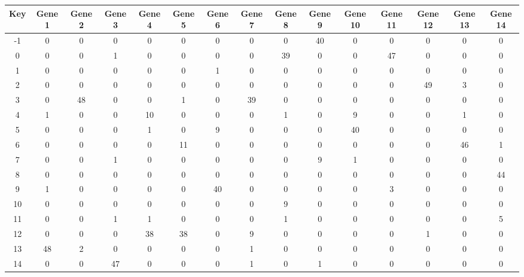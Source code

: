 \begin{tabular}{|c|c|c|c|c|c|c|c|c|c|c|c|c|c|c|}
\hline
Key & Gene 1 & Gene 2 & Gene 3 & Gene 4 & Gene 5 & Gene 6 & Gene 7 & Gene 8 & Gene 9 & Gene 10 & Gene 11 & Gene 12 & Gene 13 & Gene 14 \\
\hline
-1 & 0 & 0 & 0 & 0 & 0 & 0 & 0 & 0 & 40 & 0 & 0 & 0 & 0 & 0 \\
0 & 0 & 0 & 1 & 0 & 0 & 0 & 0 & 39 & 0 & 0 & 47 & 0 & 0 & 0 \\
1 & 0 & 0 & 0 & 0 & 0 & 1 & 0 & 0 & 0 & 0 & 0 & 0 & 0 & 0 \\
2 & 0 & 0 & 0 & 0 & 0 & 0 & 0 & 0 & 0 & 0 & 0 & 49 & 3 & 0 \\
3 & 0 & 48 & 0 & 0 & 1 & 0 & 39 & 0 & 0 & 0 & 0 & 0 & 0 & 0 \\
4 & 1 & 0 & 0 & 10 & 0 & 0 & 0 & 1 & 0 & 9 & 0 & 0 & 1 & 0 \\
5 & 0 & 0 & 0 & 1 & 0 & 9 & 0 & 0 & 0 & 40 & 0 & 0 & 0 & 0 \\
6 & 0 & 0 & 0 & 0 & 11 & 0 & 0 & 0 & 0 & 0 & 0 & 0 & 46 & 1 \\
7 & 0 & 0 & 1 & 0 & 0 & 0 & 0 & 0 & 9 & 1 & 0 & 0 & 0 & 0 \\
8 & 0 & 0 & 0 & 0 & 0 & 0 & 0 & 0 & 0 & 0 & 0 & 0 & 0 & 44 \\
9 & 1 & 0 & 0 & 0 & 0 & 40 & 0 & 0 & 0 & 0 & 3 & 0 & 0 & 0 \\
10 & 0 & 0 & 0 & 0 & 0 & 0 & 0 & 9 & 0 & 0 & 0 & 0 & 0 & 0 \\
11 & 0 & 0 & 1 & 1 & 0 & 0 & 0 & 1 & 0 & 0 & 0 & 0 & 0 & 5 \\
12 & 0 & 0 & 0 & 38 & 38 & 0 & 9 & 0 & 0 & 0 & 0 & 1 & 0 & 0 \\
13 & 48 & 2 & 0 & 0 & 0 & 0 & 1 & 0 & 0 & 0 & 0 & 0 & 0 & 0 \\
14 & 0 & 0 & 47 & 0 & 0 & 0 & 1 & 0 & 1 & 0 & 0 & 0 & 0 & 0 \\
\hline
\end{tabular}